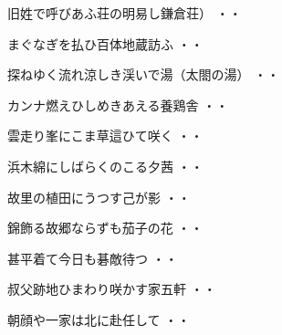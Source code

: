 \vspace{0.6cm}
\begin{shiika}旧姓で呼びあふ荘の明易し鎌倉荘）
\hfill{・・}\end{shiika}
\vspace{0.6cm}
\begin{shiika}まぐなぎを払ひ百体地蔵訪ふ
\hfill{・・}\end{shiika}
\vspace{0.6cm}
\begin{shiika}探ねゆく流れ涼しき渓いで湯（太閤の湯）
\hfill{・・}\end{shiika}
\vspace{0.6cm}
\begin{shiika}カンナ燃えひしめきあえる養鶏舎
\hfill{・・}\end{shiika}
\vspace{0.6cm}
\begin{shiika}雲走り峯にこま草這ひて咲く
\hfill{・・}\end{shiika}
\vspace{0.6cm}
\begin{shiika}浜木綿にしばらくのこる夕茜
\hfill{・・}\end{shiika}
\vspace{0.6cm}
\begin{shiika}故里の植田にうつす己が影
\hfill{・・}\end{shiika}
\vspace{0.6cm}
\begin{shiika}錦飾る故郷ならずも茄子の花
\hfill{・・}\end{shiika}
\vspace{0.6cm}
\begin{shiika}甚平着て今日も碁敵待つ
\hfill{・・}\end{shiika}
\vspace{0.6cm}
\begin{shiika}叔父跡地ひまわり咲かす家五軒
\hfill{・・}\end{shiika}
\vspace{0.6cm}
\begin{shiika}朝顔や一家は北に赴任して
\hfill{・・}\end{shiika}
